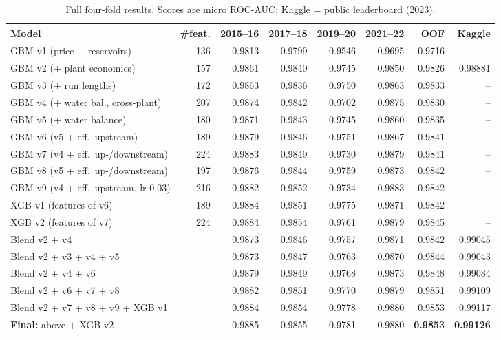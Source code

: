 \documentclass[11pt,a4paper]{article}
\begin{document}
\begin{table}[ht]
\centering\small
\caption{Full four-fold results. Scores are micro ROC-AUC; Kaggle = public leaderboard (2023).}
\label{tab:main}
\setlength{\tabcolsep}{4pt}
\begin{tabular}{lrrrrrrr}
\toprule
Model & \#feat. & 2015--16 & 2017--18 & 2019--20 & 2021--22 & OOF & Kaggle\\
\midrule
GBM v1 (price + reservoirs)           & 136 & 0.9813 & 0.9799 & 0.9546 & 0.9695 & 0.9716 & --\\
GBM v2 (+ plant economics)            & 157 & 0.9861 & 0.9840 & 0.9745 & 0.9850 & 0.9826 & 0.98881\\
GBM v3 (+ run lengths)                & 172 & 0.9863 & 0.9836 & 0.9750 & 0.9863 & 0.9833 & --\\
GBM v4 (+ water bal., cross-plant)    & 207 & 0.9874 & 0.9842 & 0.9702 & 0.9875 & 0.9830 & --\\
GBM v5 (+ water balance)              & 180 & 0.9871 & 0.9843 & 0.9745 & 0.9860 & 0.9835 & --\\
GBM v6 (v5 + eff.\ upstream)          & 189 & 0.9879 & 0.9846 & 0.9751 & 0.9867 & 0.9841 & --\\
GBM v7 (v4 + eff.\ up-/downstream)    & 224 & 0.9883 & 0.9849 & 0.9730 & 0.9879 & 0.9841 & --\\
GBM v8 (v5 + eff.\ up-/downstream)    & 197 & 0.9876 & 0.9844 & 0.9759 & 0.9873 & 0.9842 & --\\
GBM v9 (v4 + eff.\ upstream, lr 0.03) & 216 & 0.9882 & 0.9852 & 0.9734 & 0.9883 & 0.9842 & --\\
XGB v1 (features of v6)               & 189 & 0.9884 & 0.9851 & 0.9775 & 0.9871 & 0.9842 & --\\
XGB v2 (features of v7)               & 224 & 0.9884 & 0.9854 & 0.9761 & 0.9879 & 0.9845 & --\\
\midrule
Blend v2 + v4                         &     & 0.9873 & 0.9846 & 0.9757 & 0.9871 & 0.9842 & 0.99045\\
Blend v2 + v3 + v4 + v5               &     & 0.9873 & 0.9847 & 0.9763 & 0.9870 & 0.9844 & 0.99043\\
Blend v2 + v4 + v6                    &     & 0.9879 & 0.9849 & 0.9768 & 0.9873 & 0.9848 & 0.99084\\
Blend v2 + v6 + v7 + v8               &     & 0.9882 & 0.9851 & 0.9770 & 0.9879 & 0.9851 & 0.99109\\
Blend v2 + v7 + v8 + v9 + XGB v1      &     & 0.9884 & 0.9854 & 0.9778 & 0.9880 & 0.9853 & 0.99117\\
\textbf{Final:} above + XGB v2         &     & 0.9885 & 0.9855 & 0.9781 & 0.9880 & \textbf{0.9853} & \textbf{0.99126}\\
\bottomrule
\end{tabular}
\end{table}
\end{document}
